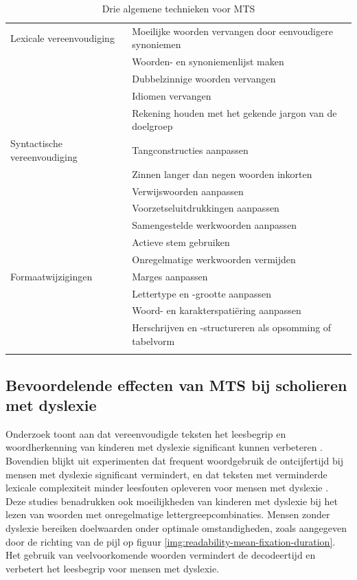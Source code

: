 \begin{center}
		\begin{table}[H]
			\begin{tabular}{ | m{4cm} | m{11cm} | } 
			\hline
			Lexicale vereenvoudiging & Moeilijke woorden vervangen door eenvoudigere synoniemen \\ 
				& Woorden- en synoniemenlijst maken \\
				& Dubbelzinnige woorden vervangen \\
				& Idiomen vervangen \\ 
				& Rekening houden met het gekende jargon van de doelgroep \\
			\hline
			Syntactische vereenvoudiging & Tangconstructies aanpassen \\
			& Zinnen langer dan negen woorden inkorten \\
			& Verwijswoorden aanpassen \\
			& Voorzetseluitdrukkingen aanpassen \\
			& Samengestelde werkwoorden aanpassen \\
			& Actieve stem gebruiken \\
			& Onregelmatige werkwoorden vermijden \\
			\hline
			Formaatwijzigingen & Marges aanpassen \\
			& Lettertype en -grootte aanpassen \\
			& Woord- en karakterspatiëring aanpassen \\
			& Herschrijven en -structureren als opsomming of tabelvorm \\
			& \\
			\hline
		\end{tabular}
		\caption{Drie algemene technieken voor MTS}
		\label{table:manual-simplification}
	\end{table}
\end{center}

\subsection{Bevoordelende effecten van MTS bij scholieren met dyslexie}

Onderzoek toont aan dat vereenvoudigde teksten het leesbegrip en woordherkenning van kinderen met dyslexie significant kunnen verbeteren \autocite{RiveroContreras2021}. Bovendien blijkt uit experimenten dat frequent woordgebruik de ontcijfertijd bij mensen met dyslexie significant vermindert, en dat teksten met verminderde lexicale complexiteit minder leesfouten opleveren voor mensen met dyslexie \autocite{Rello2013a, Gala2016}. Deze studies benadrukken ook moeilijkheden van kinderen met dyslexie bij het lezen van woorden met onregelmatige lettergreepcombinaties. Mensen zonder dyslexie bereiken doelwaarden onder optimale omstandigheden, zoals aangegeven door de richting van de pijl op figuur \ref{img:readability-mean-fixation-duration}. Het gebruik van veelvoorkomende woorden vermindert de decodeertijd en verbetert het leesbegrip voor mensen met dyslexie.

